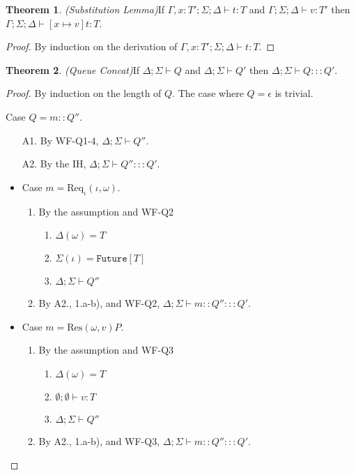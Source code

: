 \documentclass{article}
\theoremstyle{definition}
\newtheorem{thm}{Theorem}[section]
\newcommand{\Res}[2]{\text{Res}(#1, #2)}
\newcommand{\ReqF}[2]{\text{Req}_{\iota}(#1, #2)}
\begin{document}
\begin{thm}
\emph{(Substitution Lemma)}\label{th:subst}
If $\Gamma , x : T' ; \Sigma ; \Delta \vdash t : T$ and $\Gamma ; \Sigma ; \Delta \vdash v : T'$ then $\Gamma ; \Sigma ; \Delta \vdash [x \mapsto v]t : T$.
\end{thm}
\begin{proof}
By induction on the derivation of $\Gamma , x : T' ; \Sigma ; \Delta \vdash t : T$.
\end{proof}

\begin{thm}
\emph{(Queue Concat)}\label{lem:queue-concat}
If $\Delta ; \Sigma \vdash Q$ and $\Delta ; \Sigma \vdash Q'$ then $\Delta ; \Sigma \vdash Q ::: Q'$.
\end{thm}
\begin{proof}
By induction on the length of $Q$. The case where $Q = \epsilon$ is trivial.

Case $Q = m :: Q''$.
\begin{enumerate}
\item[A1.] By WF-Q1-4, $\Delta ; \Sigma \vdash Q''$.
\item[A2.] By the IH, $\Delta ; \Sigma \vdash Q'' ::: Q'$.
\end{enumerate}

\begin{itemize}
\item Case $m = {\ReqF \iota \omega}$.
\begin{enumerate}
\item By the assumption and WF-Q2
  \begin{enumerate}[label=(\alph*)]
  \item $\Delta(\omega) = T$
  \item $\Sigma(\iota) = \texttt{Future}[T]$
  \item $\Delta ; \Sigma \vdash Q''$
  \end{enumerate}
\item By A2., 1.a-b), and WF-Q2, $\Delta ; \Sigma \vdash m :: Q'' ::: Q'$.
\end{enumerate}

\item Case $m = {\Res \omega v P}$.
\begin{enumerate}
\item By the assumption and WF-Q3
  \begin{enumerate}[label=(\alph*)]
  \item $\Delta(\omega) = T$
  \item $\emptyset ; \emptyset \vdash v : T$
  \item $\Delta ; \Sigma \vdash Q''$
  \end{enumerate}
\item By A2., 1.a-b), and WF-Q3, $\Delta ; \Sigma \vdash m :: Q'' ::: Q'$.
\end{enumerate}


\end{itemize}
\end{proof}
\end{document}
